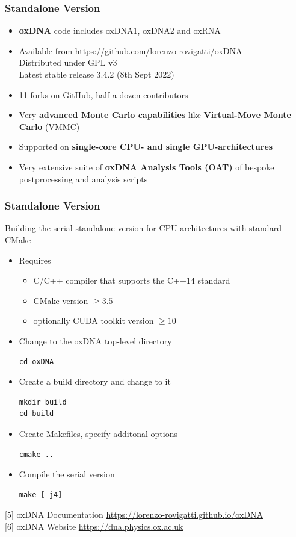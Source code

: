 \documentclass[slidestop,compress,9pt]{beamer}
\begin{document}
\begin{frame}
\frametitle{Standalone Version}

\begin{itemize}
\item \textbf{oxDNA} code includes oxDNA1, oxDNA2 and oxRNA 
\item Available from \href{https://github.com/lorenzo-rovigatti/oxDNA}{https://github.com/lorenzo-rovigatti/oxDNA}\\
Distributed under GPL v3\\
Latest stable release 3.4.2 (8th Sept 2022)
\item 11 forks on GitHub, half a dozen contributors
\item Very \textbf{advanced Monte Carlo capabilities} like \textbf{Virtual-Move Monte Carlo} (VMMC) 
\item Supported on \textbf{single-core CPU- and single GPU-architectures}
\item Very extensive suite of \textbf{oxDNA Analysis Tools (OAT)} of bespoke postprocessing and analysis scripts 
\end{itemize}

\end{frame}

\begin{frame}[fragile]
\frametitle{Standalone Version}
Building the serial standalone version for CPU-architectures with standard CMake

\begin{itemize}
\item Requires

\begin{itemize}
\item C/C++ compiler that supports the C++14 standard
\item CMake version $\ge 3.5$
\item optionally CUDA toolkit version $\ge 10$
\end{itemize}
\item Change to the oxDNA top-level directory
\linespread{0.4}
\begin{lstlisting}
cd oxDNA
\end{lstlisting}
\item Create a build directory and change to it
\begin{lstlisting}
mkdir build
cd build
\end{lstlisting}
\item Create Makefiles, specify additonal options
\begin{lstlisting}
cmake ..
\end{lstlisting}
\item Compile the serial version
\begin{lstlisting}
make [-j4]
\end{lstlisting}
\end{itemize}

[5] oxDNA Documentation \href{https://lorenzo-rovigatti.github.io/oxDNA}{https://lorenzo-rovigatti.github.io/oxDNA}\\[3pt]
[6] oxDNA Website \href{https://dna.physics.ox.ac.uk}{https://dna.physics.ox.ac.uk}

\end{frame}
\end{document}
